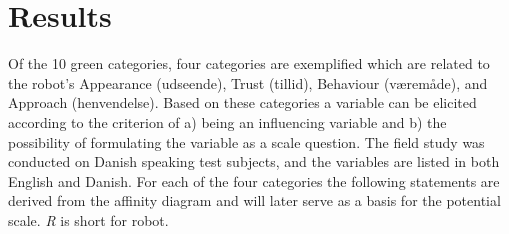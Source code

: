 \section{Results}
\label{Results}
%
Of the 10 green categories, four categories are exemplified which are related to the robot’s Appearance (udseende), Trust (tillid), Behaviour (væremåde), and Approach (henvendelse). Based on these categories a variable can be elicited according to the criterion of a) being an influencing variable and b) the possibility of formulating the variable as a scale question. The field study was conducted on Danish speaking test subjects, and the variables are listed in both English and Danish. For each of the four categories the following statements are derived from the affinity diagram and will later serve as a basis for the potential scale. \textit{R} is short for robot.\\
%
